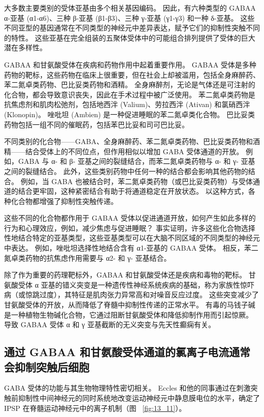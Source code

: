 大多数主要类别的受体亚基由多个相关基因编码。
因此，有六种类型的 GABAA α-亚基 (α1-α6)、三种 β-亚基 (β1-β3)、三种 γ-亚基 (γ1-γ3) 和一种 δ-亚基。
这些不同亚型的基因通常在不同类型的神经元中差异表达，赋予它们的抑制性突触不同的特性。
这些亚基在完全组装的五聚体受体中的可能组合排列提供了受体的巨大潜在多样性。


GABAA 和甘氨酸受体在疾病和药物作用中起着重要作用。
GABAA 受体是多种药物的靶标，这些药物在临床上很重要，但在社会上却被滥用，包括全身麻醉药、苯二氮卓类药物、巴比妥类药物和酒精。
全身麻醉剂，无论是气体还是可注射的化合物，都会导致意识丧失，因此在手术过程中被广泛使用。
苯二氮卓类药物是抗焦虑剂和肌肉松弛剂，包括地西泮 (Valium)、劳拉西泮 (Ativan) 和氯硝西泮 (Klonopin)。
唑吡坦 (Ambien) 是一种促进睡眠的苯二氮卓类化合物。
巴比妥类药物包括一组不同的催眠药，包括苯巴比妥和司可巴比妥。


不同类别的化合物——GABA、全身麻醉药、苯二氮卓类药物、巴比妥类药物和酒精——结合受体上的不同位点，但作用相似以增加 GABA 受体通道的开放。
例如，GABA 与 α- 和 β- 亚基之间的裂缝结合，而苯二氮卓类药物与 α- 和 γ- 亚基之间的裂缝结合。
此外，这些类别药物中任何一种的结合都会影响其他药物的结合。
例如，当 GABA 也被结合时，苯二氮卓类药物（或巴比妥类药物）与受体通道的结合更牢固，这种紧密结合有助于将通道稳定在开放状态。
以这种方式，各种化合物都增强了抑制性突触传递。


这些不同的化合物都作用于 GABAA 受体以促进通道开放，如何产生如此多样的行为和心理效应，例如，减少焦虑与促进睡眠？
事实证明，许多这些化合物选择性地结合特定的亚基类型，这些亚基类型可以在大脑不同区域的不同类型的神经元中表达。
例如，唑吡坦选择性地结合含有 α1-亚基的 GABAA 受体。
相反，苯二氮卓类药物的抗焦虑作用需要与 α2- 和 γ- 亚基结合。


除了作为重要的药理靶标外，GABAA 和甘氨酸受体还是疾病和毒物的靶标。
甘氨酸受体 α 亚基的错义突变是一种遗传性神经系统疾病的基础，称为家族性惊吓病（或惊跳过度），其特征是肌肉张力异常高和对噪音反应过度。
这些突变减少了甘氨酸受体的开放，从而降低了脊髓中抑制性传递的正常水平。
有毒的马钱子碱是一种植物生物碱化合物，它通过阻断甘氨酸受体和降低抑制作用而引起惊厥。
导致 GABAA 受体 α 和 γ 亚基截断的无义突变与先天性癫痫有关。



\subsection{通过 GABAA 和甘氨酸受体通道的氯离子电流通常会抑制突触后细胞}

GABA 受体的功能与其生物物理特性密切相关。
Eccles 和他的同事通过在刺激突触前抑制性中间神经元的同时系统地改变运动神经元中静息膜电位的水平，确定了 IPSP 在脊髓运动神经元中的离子机制（图 ~\ref{fig:13_11}）。


